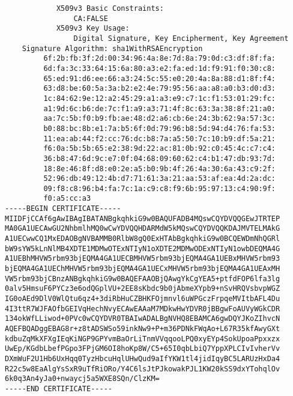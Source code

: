 \documentclass[11pt,a4paper]{article}
\begin{document}
\begin{verbatim}
            X509v3 Basic Constraints: 
                CA:FALSE
            X509v3 Key Usage: 
                Digital Signature, Key Encipherment, Key Agreement
    Signature Algorithm: sha1WithRSAEncryption
         6f:2b:fb:3f:2d:00:34:96:4a:8e:7d:8a:79:0d:c3:df:8f:fa:
         6d:fa:3c:33:64:15:6a:80:a3:e2:fa:ed:1d:f9:91:f0:30:c8:
         65:ed:91:d6:ee:66:a3:24:5c:55:e0:20:4a:8a:88:d1:8f:f4:
         63:d8:be:60:5a:3a:b2:e2:4e:79:95:56:aa:a8:a0:b3:d0:d3:
         1c:84:62:9e:12:a2:45:29:a1:a3:e9:c7:1c:f1:53:01:29:fc:
         a1:9d:6c:b6:de:7c:f1:a9:a3:71:4f:8c:63:3a:38:8f:21:a0:
         aa:7c:5b:f0:b9:fb:ae:48:d2:a6:cb:6e:24:3b:62:9a:57:3c:
         b0:88:bc:8b:e1:7a:b5:6f:0d:79:96:b8:5d:94:d4:76:fa:53:
         11:ea:ab:44:f2:cc:76:dc:b8:7a:a5:50:7c:10:b9:df:5a:21:
         f6:0a:5b:5b:65:e2:38:9d:22:ac:81:0b:92:c0:45:4c:c7:c4:
         36:b8:47:6d:9c:e7:0f:04:68:09:60:62:c4:b1:47:db:93:7d:
         18:8e:46:8f:d8:e0:2e:a5:b0:9b:4f:26:4a:30:6a:43:c9:2f:
         52:96:db:49:12:4b:d7:71:61:3a:21:aa:53:af:ea:4d:2a:dc:
         09:f8:c8:96:b4:fa:7c:1a:c9:c8:f9:6b:95:97:13:c4:90:9f:
         f0:a5:cc:a3
-----BEGIN CERTIFICATE-----
MIIDFjCCAf6gAwIBAgIBATANBgkqhkiG9w0BAQUFADB4MQswCQYDVQQGEwJTRTEP
MA0GA1UECAwGU2NhbmlhMQ0wCwYDVQQHDARMdW5kMQswCQYDVQQKDAJMVTELMAkG
A1UECwwCQ1MxEDAOBgNVBAMMB0RlbW8gQ0ExHTAbBgkqhkiG9w0BCQEWDmNhQGRl
bW9sYW5kLnNlMB4XDTE1MDMwOTExNTIyN1oXDTE2MDMwODExNTIyN1owbDEQMA4G
A1UEBhMHVW5rbm93bjEQMA4GA1UECBMHVW5rbm93bjEQMA4GA1UEBxMHVW5rbm93
bjEQMA4GA1UEChMHVW5rbm93bjEQMA4GA1UECxMHVW5rbm93bjEQMA4GA1UEAxMH
VW5rbm93bjCBnzANBgkqhkiG9w0BAQEFAAOBjQAwgYkCgYEA5+ptfdFOP6lfa3lg
0alv5HmsuF6PYCz3e6odQGplVU+2EE8sKbdc9b0jAbmeXYpb9+nSvHRQVsbvpWGZ
IG0oAEd9DlV0WlQtu6qz4+3diRbHuCZBHKFOjmnvl6uWPGczFrpqeMVItbAFL4Du
4I3ttR7WJFAOfbGEIVqHechNvyECAwEAAaM7MDkwHwYDVR0jBBgwFoAUVyWGkCDR
134okWfLLiwod+0PVc0wCQYDVR0TBAIwADALBgNVHQ8EBAMCA6gwDQYJKoZIhvcN
AQEFBQADggEBAG8r+z8tADSWSo59inkNw9+P+m36PDNkFWqAo+L67R35kfAwyGXt
kdbuZqMkXFXgIEqKiNGP9GPYvmBaOrLiTnmVVqqooLPQ0xyEYp4SokUpoaPpxxzx
UwEp/KGdbLbefPGpo3FPjGM6OI8hoKp8W/C5+65I0qbLbiQ7YppXPLCIvIvherVv
DXmWuF2U1Hb6UxHqq0TyzHbcuHqlUHwQud9aIfYKW1tl4jidIqyBC5LARUzHxDa4
R22c5w8EaAlgYsSxR9uTfRiORo/Y4C6lsJtPJkowakPJL1KW20kSS9dxYTohqlOv
6k0q3An4yJa0+nwaycj5a5WXE8SQn/ClzKM=
-----END CERTIFICATE-----
\end{verbatim}

\newpage
\end{document}
